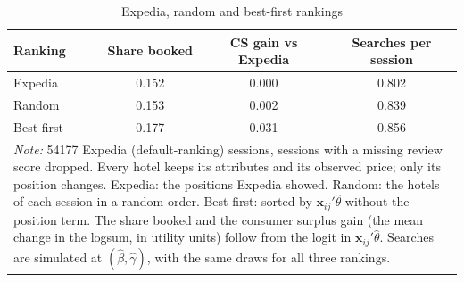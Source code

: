 \begin{table}[htbp]
\centering
\caption{Expedia, random and best-first rankings}
\label{tab:ranking}
\begin{tabular}{lccc}
\toprule
Ranking & Share booked & CS gain vs Expedia & Searches per session \\
\midrule
Expedia & 0.152 & 0.000 & 0.802 \\
Random & 0.153 & 0.002 & 0.839 \\
Best first & 0.177 & 0.031 & 0.856 \\
\bottomrule
\multicolumn{4}{p{0.9\linewidth}}{\footnotesize \textit{Note:} 54177 Expedia (default-ranking) sessions, sessions with a missing review score dropped. Every hotel keeps its attributes and its observed price; only its position changes. Expedia: the positions Expedia showed. Random: the hotels of each session in a random order. Best first: sorted by $\mathbf{x}_{ij}'\hat\theta$ without the position term. The share booked and the consumer surplus gain (the mean change in the logsum, in utility units) follow from the logit in $\mathbf{x}_{ij}'\hat\theta$. Searches are simulated at $(\hat\beta, \hat\gamma)$, with the same draws for all three rankings.} \\
\end{tabular}
\end{table}
